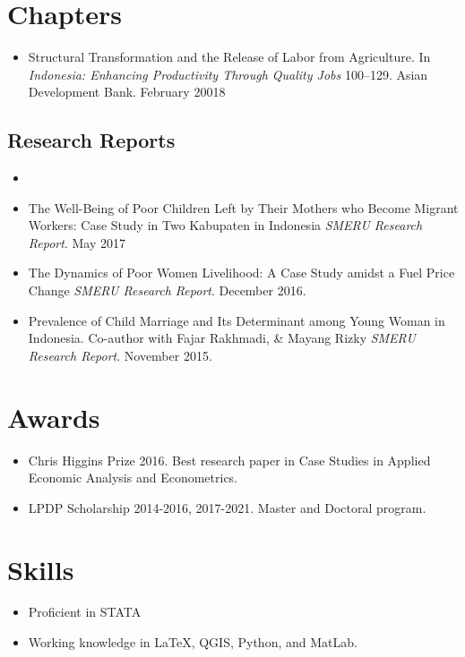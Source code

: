 \section*{Chapters}

\begin{itemize}
\item 
Structural Transformation and the Release of Labor from Agriculture. In {\it Indonesia: Enhancing Productivity Through Quality Jobs} 100--129. Asian Development Bank. February 20018
\end{itemize}


\subsection*{Research Reports}
\begin{itemize}
\item 
\item The Well-Being of Poor Children Left by Their Mothers who Become Migrant Workers: Case Study in Two Kabupaten in Indonesia {\it SMERU Research Report}. May 2017
\item The Dynamics of Poor Women Livelihood: A Case Study amidst a Fuel Price Change {\it SMERU Research Report}. December 2016.
\item Prevalence of Child Marriage and Its
Determinant among Young Woman in Indonesia. Co-author with Fajar Rakhmadi, \& Mayang Rizky {\it SMERU Research Report}. November 2015.
\end{itemize}

\section*{Awards}

\begin{itemize}
\item Chris Higgins Prize 2016. Best research paper in Case Studies in Applied Economic Analysis and Econometrics.
\item LPDP Scholarship 2014-2016, 2017-2021. Master and Doctoral program.
\end{itemize}

\section*{Skills}
\begin{itemize}
\item Proficient in STATA
\item Working knowledge in \LaTeX, QGIS, Python, and MatLab.
\end{itemize}

